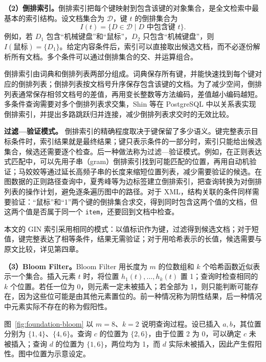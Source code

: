\textbf{（2）倒排索引。}倒排索引把每个键映射到包含该键的对象集合，是全文检索中最基本的索引结构\cite{zobel2006inverted}。设文档集合为 $\mathcal{D}$，键 $t$ 的倒排集合为
\[
I(t)=\{D\in\mathcal{D}\mid D\text{ 中包含键 }t\}.
\]
例如，若 $D_1$ 包含“机械键盘”和“鼠标”，$D_2$ 只包含“机械键盘”，则 $I(\text{鼠标})=\{D_1\}$。给定内容条件后，索引可以直接取出候选文档，而不必逐份解析所有文档。多个条件可以通过倒排集合的交、并运算组合。

倒排索引由词典和倒排列表两部分组成。词典保存所有键，并能快速找到每个键对应的倒排列表；倒排列表按文档号升序保存包含该键的文档。为了减少空间，倒排列表通常保存相邻文档号的差值，再用变长整数等方法编码，差值越小编码越短\cite{zobel2006inverted}。多条件查询需要对多个倒排列表求交集，Shin 等在 PostgreSQL 中以关系表实现倒排索引，并提出多路跳跃归并连接，减少倒排列表求交时的无效比较\cite{shin2022join}。

\textbf{过滤—验证模式。} 倒排索引的精确程度取决于键保留了多少语义。键完整表示目标条件时，索引结果就是最终结果；键只表示条件的一部分时，索引只能给出候选集合，候选还需要逐个检查。后一种做法称为过滤—验证模式。例如，在正则表达式匹配中，可以先用子串（gram）倒排索引找到可能匹配的位置，再用自动机验证；马姣姣等通过延长高频子串的长度来缩短位置列表，减少需要验证的候选\cite{ma2025vgram}。在图数据的正则路径查询中，夏秀峰等为边标签建立倒排索引，把查询转换为对倒排列表的操作计划，避免逐条遍历图中的路径\cite{xia2024rpq}。对于 XML，结构关联的条件同样需要验证：“鼠标”和“1”两个键的倒排集合求交，得到同时包含这两个值的文档，但这两个值是否属于同一个 \texttt{item}，还要回到文档中检查。

本文的 GIN 索引采用相同的模式：以值标识作为键，过滤得到候选文档；对于短值，键完整表达了相等条件，结果无需验证；对于用哈希表示的长值，候选需要与原文比较，详见第四章。

\textbf{（3）Bloom Filter。}Bloom Filter 用长度为 $m$ 的位数组和 $k$ 个哈希函数近似表示一个集合\cite{bloom1970space}。插入元素 $t$ 时，将位置 $h_1(t),\ldots,h_k(t)$ 置 1；查询时检查相同的 $k$ 个位置。若任一位为 0，则元素一定未被插入；若全部为 1，则只能判断可能存在，因为这些位可能是由其他元素置位的。前一种情况称为阴性结果，后一种情况中元素实际不存在的称为假阳性。

图~\ref{fig:foundation-bloom} 以 $m=8$、$k=2$ 说明查询过程。设已插入 $a,b$，其位置分别为 $\{1,4\}$、$\{4,6\}$。查询 $c$ 的位置为 $\{2,6\}$，由于位置 2 为 0，可以确定 $c$ 未被插入；查询 $d$ 的位置为 $\{1,6\}$，两位均为 1，而 $d$ 实际未被插入，因此产生假阳性。图中位置为示意设定。

